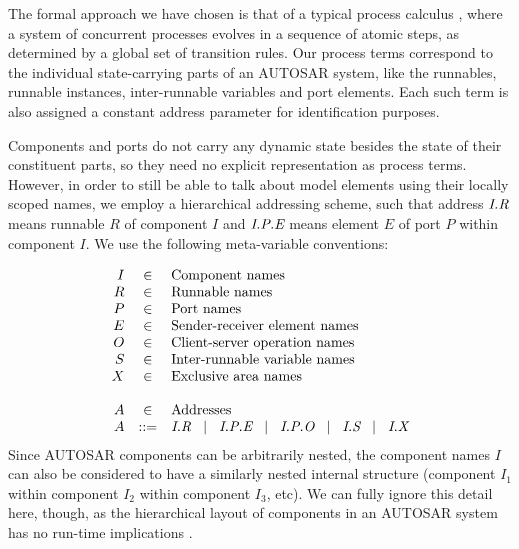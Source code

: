 \documentclass[twocolumn]{article}
\begin{document}
The formal approach we have chosen is that of a typical process calculus \cite{TODO}, where a system of concurrent processes evolves in a sequence of atomic steps, as determined by a global set of transition rules. Our process terms correspond to the individual state-carrying parts of an AUTOSAR system, like the runnables, runnable instances, inter-runnable variables and port elements. Each such term is also assigned a constant address parameter for identification purposes.

Components and ports do not carry any dynamic state besides the state of their constituent parts, so they need no explicit representation as process terms. However, in order to still be able to talk about model elements using their locally scoped names, we employ a hierarchical addressing scheme, such that address $\Tr{R}{I}$ means runnable $R$ of component $I$ and $\Tep{E}{P}{I}$ means element $E$ of port $P$ within component $I$. We use the following meta-variable conventions:

%
\[
\begin{array}{rcll}
  I & \in & \text{Component names} \\
  R & \in & \text{Runnable names} \\
  P & \in & \text{Port names} \\
  E & \in & \text{Sender-receiver element names} \\
  O & \in & \text{Client-server operation names} \\
  S & \in & \text{Inter-runnable variable names} \\
  X & \in & \text{Exclusive area names} \\
\\
  A & \in & \text{Addresses} \\
  A & ::= & \Tr{R}{I}   \sep   \Tep{E}{P}{I}   \sep \Top{O}{P}{I}   \sep   \Ts{S}{I}   \sep   \Tx{X}{I}   \\
\end{array}
\]
%
Since AUTOSAR components can be arbitrarily nested, the component names $I$ can also be considered to have a similarly nested internal structure (component $I_1$ within component $I_2$ within component $I_3$, etc). We can fully ignore this detail here, though, as the hierarchical layout of components in an AUTOSAR system has no run-time implications \cite{TODO2}.
\end{document}
